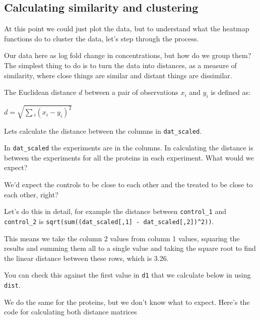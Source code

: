 \documentclass[12pt,]{book}
\begin{document}
\hypertarget{calculating-similarity-and-clustering}{%
\subsection{Calculating similarity and clustering}\label{calculating-similarity-and-clustering}}

At this point we could just plot the data, but to understand what the heatmap
functions do to cluster the data, let's step through the process.

Our data here as log fold change in concentrations, but how do we group them?
The simplest thing to do is to turn the data into distances, as a measure of
similarity, where close things are similar and distant things are dissimilar.

The Euclidean distance \(d\) between a pair of observations \(x_i\) and \(y_i\) is defined as:

\(d = \sqrt{\sum{_i}(x_i - y_i)^2}\)

Lets calculate the distance between the columns in \texttt{dat\_scaled}.

In \texttt{dat\_scaled} the experiments are in the columns. In calculating the distance
is between the experiments for all the proteins in each experiment. What would
we expect?

We'd expect the controls to be close to each other and the treated to be close
to each other, right?

Let's do this in detail, for example the distance between \texttt{control\_1} and
\texttt{control\_2} is \texttt{sqrt(sum((dat\_scaled{[},1{]}\ -\ dat\_scaled{[},2{]})\^{}2))}.

This means we take the column 2 values from column 1 values, squaring the results
and summing them all to a single value and taking the square root to find the
linear distance between these rows, which is 3.26.

You can check this against the first value in \texttt{d1} that we calculate below in using \texttt{dist}.

We do the same for the proteins, but we don't know what to expect. Here's the
code for calculating both distance matrices
\end{document}
